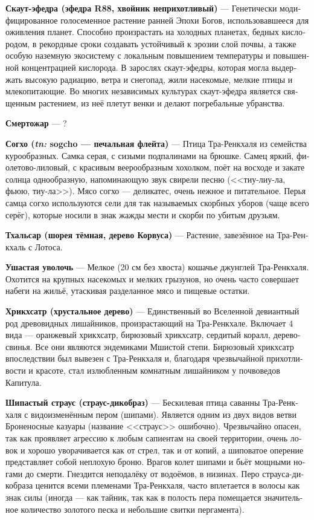\documentclass[a4paper,12pt,fleqn]{book}\usepackage{cooltooltips}\usepackage{polyglossia}\setdefaultlanguage[babelshorthands=true]{russian}\setotherlanguage{english}\defaultfontfeatures{Ligatures=TeX,Mapping=tex-text} \usepackage{xcolor}\definecolor{lightgray}{HTML}{bbbbbb}\color{lightgray}\newcommand{\ml}[3]{\textenglish{\textcolor{black}{#3}}}
\newcommand{\theterm}[3]{\textbf{\hypertarget{#1}{#2}} --- #3}
\newcommand{\theorigin}[3]{\textit{#1:} #2 --- #3}
\begin{document}
\theterm{scout-ephedra}
{Скаут-эфедра (эфедра R88, хвойник неприхотливый)}
{Генетически модифицированное голосеменное растение ранней Эпохи Богов, использовавшееся для оживления планет.
Способно произрастать на холодных планетах, бедных кислородом, в рекордные сроки создавать устойчивый к эрозии слой почвы, а также особую наземную экосистему с локальным повышением температуры и повышенной концентрацией кислорода.
В зарослях скаут-эфедры, которая могла выдержать высокую радиацию, ветра и снегопад, жили насекомые, мелкие птицы и млекопитающие.
Во многих независимых культурах скаут-эфедра является священным растением, из неё плетут венки и делают погребальные убранства.}

\theterm{deathly-heat}
{Смертожар}
{?}

\theterm{}
{Согхо (\theorigin{tn}{sogcho}{печальная флейта})}
{Птица Тра-Ренкхаля из семейства курообразных.
Самка серая, с сизыми подпалинами на брюшке.
Самец яркий, фиолетово-лиловый, с красивым веерообразным хохолком, поёт на восходе и закате солнца однообразную, напоминающую звук свирели песню (<<тиу-лиу-ла, фьюю, тиу-ла>>).
Мясо согхо --- деликатес, очень нежное и питательное.
Перья самца согхо используются сели для так называемых скорбных уборов (чаще всего серёг), которые носили в знак жажды мести и скорби по убитым друзьям.}

\theterm{tchal-sar}
{Тхальсар (шорея тёмная, дерево Корвуса)}
{Растение, завезённое на Тра-Ренкхаль с Лотоса.}

\theterm{large-eared-dragaway}
{Ушастая уволочь}
{Мелкое (20 см без хвоста) кошачье джунглей Тра-Ренкхаля.
Охотится на крупных насекомых и мелких грызунов, но очень часто совершает набеги на жильё, утаскивая разделанное мясо и пищевые остатки.}

\theterm{chrikchsatr}
{Хрикхсатр (хрустальное дерево)}
{Единственный во Вселенной девиантный род древовидных лишайников, произрастающий на Тра-Ренкхале.
Включает 4 вида --- оранжевый хрикхсатр, бирюзовый хрикхсатр, сердитый коралл, дерево-свинья.
Все они являются эндемиками Мшистой степи.
Бирюзовый хрикхсатр впоследствии был вывезен с Тра-Ренкхаля и, благодаря чрезвычайной прихотливости и красоте, стал излюбленным комнатным лишайником у почвоведов Капитула.}

\theterm{spiny-ostrich}
{Шипастый страус (страус-дикобраз)}
{Бескилевая птица саванны Тра-Ренкхаля с видоизменённым пером (шипами).
Является одним из двух видов ветви Броненосные казуары (название <<страус>> ошибочно).
Чрезвычайно опасен, так как проявляет агрессию к любым сапиентам на своей территории, очень ловок и хорошо уворачивается как от стрел, так и от копий, а шиповатое оперение представляет собой неплохую броню.
Врагов колет шипами и бьёт мощными ногами до смерти.
Гнездится неподалёку от водоёмов, в низинах.
Перо страуса-дикобраза ценится всеми племенами Тра-Ренкхаля, часто вплетается в волосы как знак силы (иногда --- как тайник, так как в полость пера помещается значительное количество золотого песка и небольшие свитки пергамента).}
\end{document}
